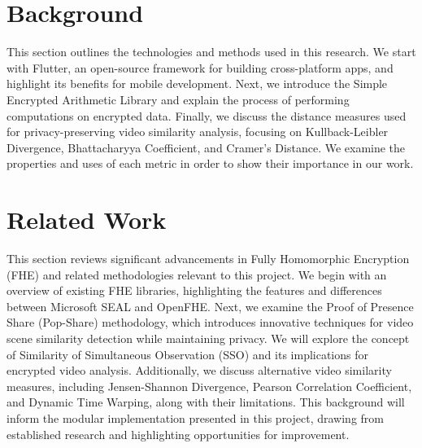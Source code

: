 \documentclass [11pt, proquest] {uwthesis}[2020/02/24]
\begin{document}




 
\chapter{Background}

This section outlines the technologies and methods used in this research. We start with Flutter, an open-source framework for building cross-platform apps, and highlight its benefits for mobile development. Next, we introduce the Simple Encrypted Arithmetic Library and explain the process of performing computations on encrypted data. Finally, we discuss the distance measures used for privacy-preserving video similarity analysis, focusing on Kullback-Leibler Divergence, Bhattacharyya Coefficient, and Cramer’s Distance. We examine the properties and uses of each metric in order to show their importance in our work.





 
\chapter{Related Work}

This section reviews significant advancements in Fully Homomorphic Encryption (FHE) and related methodologies relevant to this project. We begin with an overview of existing FHE libraries, highlighting the features and differences between Microsoft SEAL and OpenFHE. Next, we examine the Proof of Presence Share (Pop-Share) methodology, which introduces innovative techniques for video scene similarity detection while maintaining privacy. We will explore the concept of Similarity of Simultaneous Observation (SSO) and its implications for encrypted video analysis. Additionally, we discuss alternative video similarity measures, including Jensen-Shannon Divergence, Pearson Correlation Coefficient, and Dynamic Time Warping, along with their limitations. This background will inform the modular implementation presented in this project, drawing from established research and highlighting opportunities for improvement.




\end{document}
